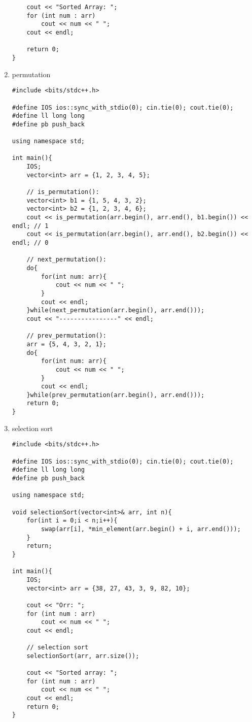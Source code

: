 \documentclass[12pt, a4paper]{article}
\begin{document}
\begin{enumerate}
\begin{lstlisting}
    cout << "Sorted Array: ";
    for (int num : arr)
        cout << num << " ";
    cout << endl;

    return 0;
}
\end{lstlisting}

\item permutation

\begin{lstlisting}
#include <bits/stdc++.h>

#define IOS ios::sync_with_stdio(0); cin.tie(0); cout.tie(0);
#define ll long long
#define pb push_back

using namespace std;

int main(){
    IOS;
    vector<int> arr = {1, 2, 3, 4, 5};

    // is_permutation():
    vector<int> b1 = {1, 5, 4, 3, 2};
    vector<int> b2 = {1, 2, 3, 4, 6};
    cout << is_permutation(arr.begin(), arr.end(), b1.begin()) << endl; // 1
    cout << is_permutation(arr.begin(), arr.end(), b2.begin()) << endl; // 0

    // next_permutation():
    do{
        for(int num: arr){
            cout << num << " ";
        }
        cout << endl;
    }while(next_permutation(arr.begin(), arr.end()));
    cout << "----------------" << endl;

    // prev_permutation():
    arr = {5, 4, 3, 2, 1};
    do{
        for(int num: arr){
            cout << num << " ";
        }
        cout << endl;
    }while(prev_permutation(arr.begin(), arr.end()));
    return 0;
}
\end{lstlisting}
\item selection sort
\begin{lstlisting}
#include <bits/stdc++.h>

#define IOS ios::sync_with_stdio(0); cin.tie(0); cout.tie(0);
#define ll long long
#define pb push_back

using namespace std;

void selectionSort(vector<int>& arr, int n){
    for(int i = 0;i < n;i++){
        swap(arr[i], *min_element(arr.begin() + i, arr.end()));
    }
    return;
}

int main(){
    IOS;
    vector<int> arr = {38, 27, 43, 3, 9, 82, 10};

    cout << "Orr: ";
    for (int num : arr)
        cout << num << " ";
    cout << endl;

    // selection sort
    selectionSort(arr, arr.size());

    cout << "Sorted array: ";
    for (int num : arr)
        cout << num << " ";
    cout << endl;
    return 0;
}
\end{lstlisting}
\end{enumerate}
\end{document}
